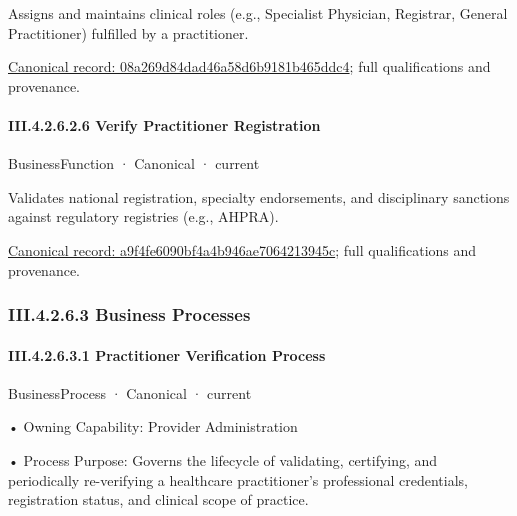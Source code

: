 Assigns and maintains clinical roles (e.g., Specialist Physician, Registrar, General Practitioner) fulfilled by a practitioner.


{\footnotesize \href{../../../../../../../continuum/business/business-function/08a269d84dad46a58d6b9181b465ddc4.md}{Canonical record: 08a269d84dad46a58d6b9181b465ddc4}; full qualifications and provenance.}\par
\paragraph*{III.4.2.6.2.6 Verify Practitioner Registration}
\label{navigation:III.4.2.6.2.6}

\label{element:a9f4fe6090bf4a4b946ae7064213945c}
{\small BusinessFunction · Canonical · current}\par

Validates national registration, specialty endorsements, and disciplinary sanctions against regulatory registries (e.g., AHPRA).


{\footnotesize \href{../../../../../../../continuum/business/business-function/a9f4fe6090bf4a4b946ae7064213945c.md}{Canonical record: a9f4fe6090bf4a4b946ae7064213945c}; full qualifications and provenance.}\par
\subsubsection*{III.4.2.6.3 Business Processes}
\label{navigation:III.4.2.6.3}

\paragraph*{III.4.2.6.3.1 Practitioner Verification Process}
\label{navigation:III.4.2.6.3.1}

\label{element:32a3e1f948474d3aa77ca71bfa515f58}
{\small BusinessProcess · Canonical · current}\par

•
Owning Capability: Provider Administration



•
Process Purpose: Governs the lifecycle of validating, certifying, and periodically re-verifying a healthcare practitioner's professional credentials, registration status, and clinical scope of practice.



